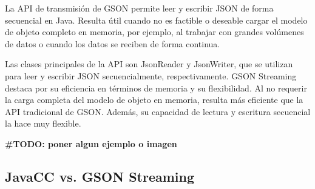 


\noindent La API de transmisión de GSON permite leer y escribir JSON de forma secuencial en Java. Resulta útil cuando no es factible o deseable cargar el modelo de objeto completo en memoria, por ejemplo, al trabajar con grandes volúmenes de datos o cuando los datos se reciben de forma continua.

Las clases principales de la API son JsonReader y JsonWriter, que se utilizan para leer y escribir JSON secuencialmente, respectivamente. GSON Streaming destaca por su eficiencia en términos de memoria y su flexibilidad. Al no requerir la carga completa del modelo de objeto en memoria, resulta más eficiente que la API tradicional de GSON. Además, su capacidad de lectura y escritura secuencial la hace muy flexible.

\textbf{\#TODO: poner algun ejemplo o imagen}

\subsection{JavaCC vs. GSON Streaming}



